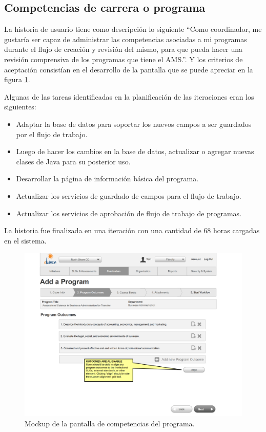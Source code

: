 \subsection{Competencias de carrera o programa}
La historia de usuario tiene como descripción lo siguiente \enquote{Como coordinador, me gustaría ser capaz de administrar las competencias asociadas a mi programas durante el flujo de creación y revisión del mismo, para que pueda hacer una revisión comprensiva de los programas que tiene el AMS.}. Y los criterios de aceptación consistían en el desarrollo de la pantalla que se puede apreciar en la figura \ref{program_learning_outcomes}.

Algunas de las tareas identificadas en la planificación de las iteraciones eran los siguientes:
\begin{itemize}
	\item Adaptar la base de datos para soportar los nuevos campos a ser guardados por el flujo de trabajo.
	\item Luego de hacer los cambios en la base de datos, actualizar o agregar nuevas clases de Java para su posterior uso.
	\item Desarrollar la página de información básica del programa.
	\item Actualizar los servicios de guardado de campos para el flujo de trabajo.
	\item Actualizar los servicios de aprobación de flujo de trabajo de programas.
\end{itemize}

La historia fue finalizada en una iteración con una cantidad de 68 horas cargadas en el sistema.

\begin{figure}[H]
\centering
\includegraphics[width=125mm,scale=1]{Capitulos/DesarrollodelaAplicacion/Imagenes/program_learning_outcomes}
\caption{Mockup de la pantalla de competencias del programa.}
  \label{program_learning_outcomes}
\end{figure}

